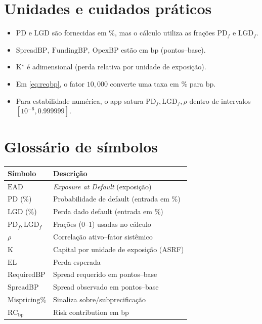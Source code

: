 \documentclass[11pt,a4paper]{article}
\newcommand{\PD}{\mathrm{PD}}
\newcommand{\LGD}{\mathrm{LGD}}
\newcommand{\EAD}{\mathrm{EAD}}
\newcommand{\EL}{\mathrm{EL}}
\newcommand{\Kcap}{\mathrm{K}}
\newcommand{\Rho}{\rho}
\newcommand{\bp}{\mathrm{bp}}
\begin{document}
\section{Unidades e cuidados práticos}
\begin{itemize}[leftmargin=1.2em]
  \item \(\PD\) e \(\LGD\) são fornecidas em \%, mas o cálculo utiliza as frações \(\PD_f\) e \(\LGD_f\).
  \item \(\mathrm{SpreadBP},\ \mathrm{FundingBP},\ \mathrm{OpexBP}\) estão em \(\bp\) (pontos--base).
  \item \(\Kcap^\star\) é adimensional (perda relativa por unidade de exposição).
  \item Em \eqref{eq:reqbp}, o fator \(10{,}000\) converte uma taxa em \% para \(\bp\).
  \item Para estabilidade numérica, o app satura \(\PD_f,\LGD_f,\Rho\) dentro de intervalos \([10^{-6},0.999999]\).
\end{itemize}

\section{Glossário de símbolos}
\begin{center}
\begin{tabular}{@{}ll@{}}
\toprule
Símbolo & Descrição \\
\midrule
\(\EAD\) & \emph{Exposure at Default} (exposição) \\
\(\PD\) (\%) & Probabilidade de default (entrada em \%) \\
\(\LGD\) (\%) & Perda dado default (entrada em \%) \\
\(\PD_f,\LGD_f\) & Frações (0--1) usadas no cálculo \\
\(\Rho\) & Correlação ativo--fator sistêmico \\
\(\Kcap\) & Capital por unidade de exposição (ASRF) \\
\(\EL\) & Perda esperada \\
\(\mathrm{RequiredBP}\) & Spread requerido em pontos--base \\
\(\mathrm{SpreadBP}\) & Spread observado em pontos--base \\
\(\mathrm{Mispricing\%}\) & Sinaliza sobre/subprecificação \\
\(\mathrm{RC}_{\bp}\) & Risk contribution em bp \\
\bottomrule
\end{tabular}
\end{center}
\end{document}
